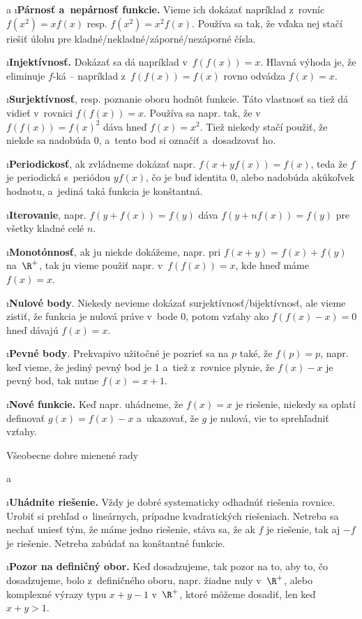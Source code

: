 \begitems \style a
\i \textbf{Párnosť a~nepárnosť funkcie.} Vieme ich dokázať napríklad z~rovníc $f(x^2)=xf(x)$ resp. $f(x^2)=x^2f(x)$. Používa sa tak, že vďaka nej stačí riešiť úlohu pre kladné/nekladné/záporné/nezáporné čísla.

\i \textbf{Injektívnosť.} Dokázať sa dá napríklad v~$f(f(x))=x$. Hlavná výhoda je, že eliminuje $f$-ká -- napríklad z~$f(f(x))=f(x)$ rovno odvádza $f(x)=x$.

\i \textbf{Surjektívnosť}, resp. poznanie oboru hodnôt funkcie. Táto vlastnosť sa tiež dá vidieť v~rovnici $f(f(x))=x$. Používa sa napr. tak, že v~$f(f(x))=f(x)^2$ dáva hneď $f(x)=x^2$. Tiež niekedy stačí použiť, že niekde sa nadobúda $0$, a~tento bod si označiť a~dosadzovať ho.

\i \textbf{Periodickosť}, ak zvládneme dokázať napr. $f(x+yf(x))=f(x)$, teda že $f$ je periodická s~periódou $yf(x)$, čo je buď identita $0$, alebo nadobúda akúkoľvek hodnotu, a~jediná taká funkcia je konštantná.

\i \textbf{Iterovanie}, napr. $f(y+f(x))=f(y)$ dáva $f(y+nf(x))=f(y)$ pre všetky kladné celé $n$.

\i \textbf{Monotónnosť}, ak ju niekde dokážeme, napr. pri $f(x+y)=f(x)+f(y)$ na~$\R^+$, tak ju vieme použiť napr. v~$f(f(x))=x$, kde hneď máme $f(x)=x$.

\i \textbf{Nulové body}. Niekedy nevieme dokázať surjektívnosť/bijektívnosť, ale vieme zistiť, že funkcia je nulová práve v~bode $0$, potom vzťahy ako $f(f(x)-x)=0$ hneď dávajú $f(x)=x$.

\i \textbf{Pevné body}. Prekvapivo užitočné je pozrieť sa na $p$ také, že $f(p)=p$, napr. keď vieme, že jediný pevný bod je $1$ a~tiež z~rovnice plynie, že $f(x)-x$ je pevný bod, tak nutne $f(x)=x+1$.

\i \textbf{Nové funkcie.} Keď napr. uhádneme, že $f(x)=x$ je riešenie, niekedy sa oplatí definovať $g(x)=f(x)-x$ a~ukazovať, že $g$ je nulová, vie to sprehľadniť vzťahy.

\enditems

\sec Všeobecne dobre mienené rady

\begitems \style a

\i \textbf{Uhádnite riešenie.} Vždy je dobré systematicky odhadnúť riešenia rovnice. Urobiť si prehľad o~lineárnych,
prípadne kvadratických riešeniach. Netreba sa nechať uniesť tým, že máme jedno
riešenie, stáva sa, že ak $f$ je riešenie, tak aj $-f$ je riešenie. Netreba zabúdať na
konštantné funkcie.

\i \textbf{Pozor na definičný obor.} Keď dosadzujeme, tak pozor na to, aby to, čo dosadzujeme, bolo z~definičného oboru, napr. žiadne nuly v~$\R^+$, alebo komplexné výrazy typu $x+y-1$ v~$\R^+$, ktoré môžeme dosadiť, len keď $x+y>1$.

